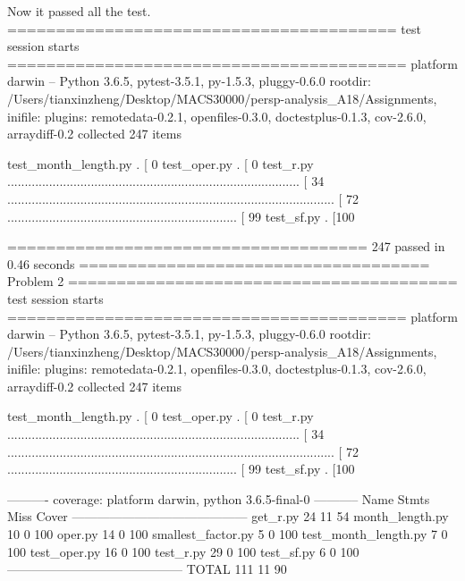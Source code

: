 \documentclass[11pt]{article}
\begin{document}
    Now it passed all the test.
======================================== test session starts =========================================
platform darwin -- Python 3.6.5, pytest-3.5.1, py-1.5.3, pluggy-0.6.0
rootdir: /Users/tianxinzheng/Desktop/MACS30000/persp-analysis_A18/Assignments, inifile:
plugins: remotedata-0.2.1, openfiles-0.3.0, doctestplus-0.1.3, cov-2.6.0, arraydiff-0.2
collected 247 items                                                                                  

test_month_length.py .                                                                         [  0%
test_oper.py .                                                                                 [  0%
test_r.py .................................................................................... [ 34%
.............................................................................................. [ 72%
..................................................................                             [ 99%
test_sf.py .                                                                                   [100%

===================================== 247 passed in 0.46 seconds ====================================
    Problem 2
======================================== test session starts =========================================
platform darwin -- Python 3.6.5, pytest-3.5.1, py-1.5.3, pluggy-0.6.0
rootdir: /Users/tianxinzheng/Desktop/MACS30000/persp-analysis_A18/Assignments, inifile:
plugins: remotedata-0.2.1, openfiles-0.3.0, doctestplus-0.1.3, cov-2.6.0, arraydiff-0.2
collected 247 items                                                                                  

test_month_length.py .                                                                         [  0%
test_oper.py .                                                                                 [  0%
test_r.py .................................................................................... [ 34%
.............................................................................................. [ 72%
..................................................................                             [ 99%
test_sf.py .                                                                                   [100%

---------- coverage: platform darwin, python 3.6.5-final-0 -----------
Name                   Stmts   Miss  Cover
------------------------------------------
get_r.py                  24     11    54%
month_length.py           10      0   100%
oper.py                   14      0   100%
smallest_factor.py         5      0   100%
test_month_length.py       7      0   100%
test_oper.py              16      0   100%
test_r.py                 29      0   100%
test_sf.py                 6      0   100%
------------------------------------------
TOTAL                    111     11    90%
\end{document}
